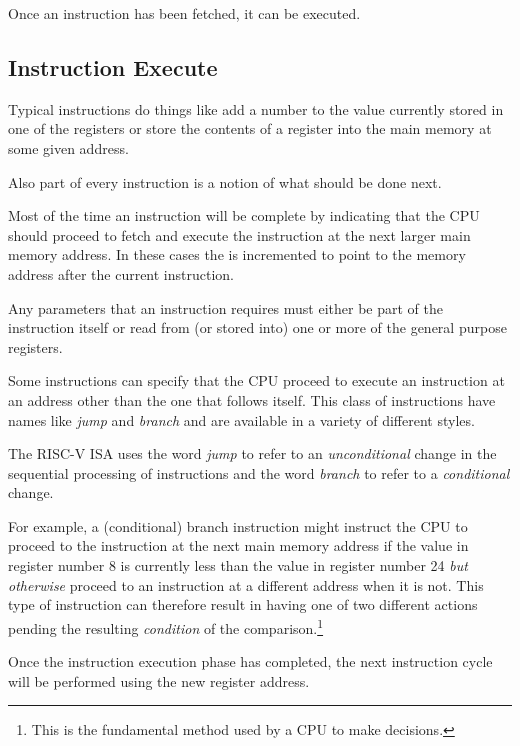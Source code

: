 Once an instruction has been fetched, it can be executed.

\subsection{Instruction Execute}

Typical instructions do things like add a number to the value
currently stored in one of the registers or store the contents of a
register into the main memory at some given address.

Also part of every instruction is a notion of what should be done next.

Most of the time an instruction will be complete by indicating that
the CPU should proceed to fetch and execute the instruction at the next
larger main memory address.  In these cases the  is incremented
to point to the memory address after the current instruction.

Any parameters that an instruction requires must either be part of 
the instruction itself or read from (or stored into) one or more of the 
general purpose registers.

Some instructions can specify that the CPU proceed to execute an
instruction at an address other than the one that follows itself.
This class of instructions have names like {\em jump} and {\em branch}
and are available in a variety of different styles.

The RISC-V ISA uses the word {\em jump} to refer to an {\em unconditional}
change in the sequential processing of instructions and the word
{\em branch} to refer to a {\em conditional} change.

For example, a (conditional) branch instruction might instruct the CPU 
to proceed to the instruction at the next main memory address if the value 
in register number 8 is currently less than the value in register number 
24 {\em but otherwise} proceed to an instruction at a different address
when it is not.  This type of instruction can therefore result in having 
one of two different actions pending the resulting {\em condition} of 
the comparison.\footnote{This is the fundamental method used by a CPU 
to make decisions.}

Once the instruction execution phase has completed, the next instruction 
cycle will be performed using the new  register address.
